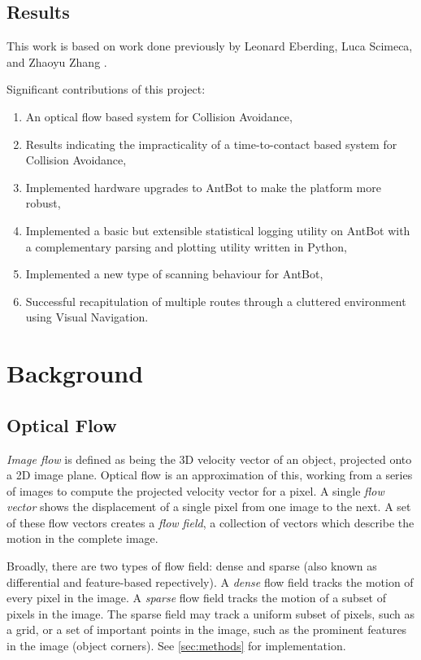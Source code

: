 \documentclass[a4paper,11pt,twoside,openright]{article}
\let\oldsection\section
\def\section{\cleardoublepage\oldsection}
\begin{document}
\subsection { Results }
This work is based on work done previously by Leonard Eberding, Luca Scimeca, and Zhaoyu Zhang
\cite{Eberding2016, Scimeca2017, Zhang2017}.
\newline

Significant contributions of this project:
\begin{enumerate}
  \item{An optical flow based system for Collision Avoidance,}
  \item{Results indicating the impracticality of a time-to-contact based system for Collision Avoidance,}
  \item{Implemented hardware upgrades to AntBot to make the platform more robust,}
  \item{Implemented a basic but extensible statistical logging utility on AntBot with a complementary parsing and plotting utility written in Python,} 
  \item{Implemented a new type of scanning behaviour for AntBot,}
  \item{Successful recapitulation of multiple routes through a cluttered environment using Visual Navigation.}
  \end{enumerate}
\newpage

\section{ Background}
\subsection{ Optical Flow }
\textit{Image flow} is defined as being the 3D velocity vector of an object, projected onto a
2D image plane\cite{ODonovan2005}. Optical flow is an approximation of this, working from a series
of images to compute the projected velocity vector for a pixel. A single \textit{flow vector}
shows the displacement of a single pixel from one image to the next. A set of these flow vectors
creates a \textit{flow field}, a collection of vectors which describe the motion in the complete image.
\newline

Broadly, there are two types of flow field: dense and sparse (also known as differential and
feature-based repectively\cite{Low2005}). A \textit{dense} flow field tracks
the motion of every pixel in the image. A \textit{sparse} flow field tracks the motion of a subset
of pixels in the image. The sparse field may track a uniform subset of pixels, such as a grid, or a
set of important points in the image, such as the prominent features in the image (object corners).
See \ref{sec:methods} for implementation.
\end{document}
